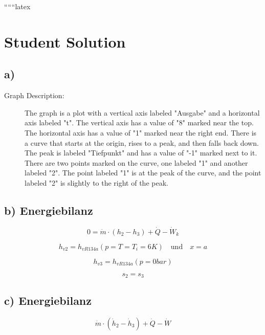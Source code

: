 
``````latex


\section*{Student Solution}

\subsection*{a)}

\begin{description}
    \item[Graph Description:] The graph is a plot with a vertical axis labeled "Ausgabe" and a horizontal axis labeled "t". The vertical axis has a value of "8" marked near the top. The horizontal axis has a value of "1" marked near the right end. There is a curve that starts at the origin, rises to a peak, and then falls back down. The peak is labeled "Tiefpunkt" and has a value of "-1" marked next to it. There are two points marked on the curve, one labeled "1" and another labeled "2". The point labeled "1" is at the peak of the curve, and the point labeled "2" is slightly to the right of the peak.
\end{description}

\subsection*{b) Energiebilanz}

\begin{equation}
0 = \dot{m} \cdot \left( h_{2} - h_{3} \right) + \dot{Q} - \dot{W}_{k}
\end{equation}

\begin{equation}
h_{v2} = h_{vR134a} \left( p = T = T_{i} = 6K \right) \quad \text{und} \quad x = a
\end{equation}

\begin{equation}
h_{v3} = h_{vR134a} \left( p = 0bar \right)
\end{equation}

\begin{equation}
s_{2} = s_{3}
\end{equation}

\subsection*{c) Energiebilanz}

\begin{equation}
\dot{m} \cdot \left( \dot{h}_{2} - \dot{h}_{3} \right) + \dot{Q} - \dot{W}
\end{equation}

